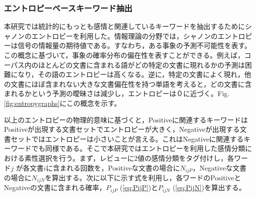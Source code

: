 \documentclass[review]{elsarticle}
\begin{document}
\begin{CJK}{UTF8}{min}
\subsubsection{エントロピーベースキーワード抽出}\label{entropy}

本研究では統計的にもっとも感情と関連しているキーワードを抽出するためにシャノンのエントロピー\cite[][]{shannon1948}を利用した。情報理論の分野では，シャノンのエントロピーは信号の情報量の期待値である。すなわち，ある事象の予測不可能性を表す。この概念に基づいて，事象の確率分布の偏在性を表すことができる。例えば，コーパス内のほとんどの文書に含まれる語がどの特定の文書に現れるかの予測は困難になり，その語のエントロピーは高くなる。逆に，特定の文書によく現れ，他の文書にほぼ含まれない大きな文書偏在性を持つ単語を考えると，どの文書に含まれるかという予測の曖昧さは減少し，エントロピーは０に近づく。Fig.\ref{fig:entropygraphs}にこの概念を示す。

以上のエントロピーの物理的意味に基づくと，Positiveに関連するキーワードはPositiveが出現する文書セットでエントロピーが大きく，Negativeが出現する文書セットではエントロピーは小さいことが言える。これはNegativeに関連するキーワードでも同様である。そこで本研究ではエントロピーを利用した感情分類における素性選択を行う。まず，レビューに2値の感情分類をタグ付けし，各ワード\(j\) が各文書\(i\)に含まれる回数を，Positiveな文書の場合に\(N_{ijP}\)，Negativeな文書の場合に\(N_{ijN}\)を算出する。次に以下に示す式を利用し，各ワードのPositiveとNegativeの文書に含まれる確率，\(P_{ijP}\) (\ref{eq:PijP})と\(P_{ijN}\) (\ref{eq:PijN})を算出する。


\end{CJK}
\end{document}

